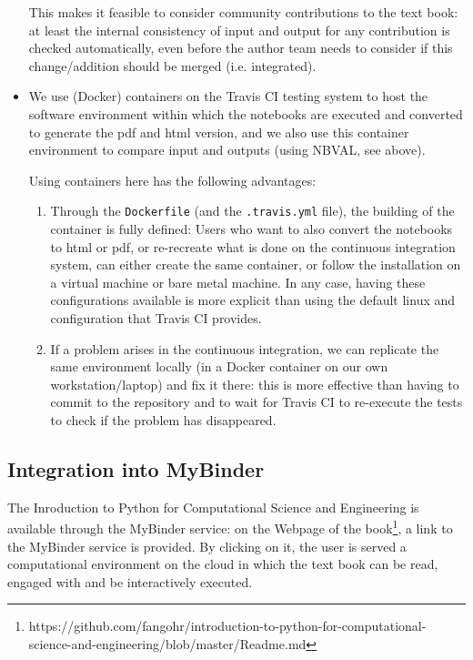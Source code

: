 \documentclass{deliverablereport}
\begin{document}
\begin{itemize}
  This makes it feasible to consider community contributions to the
  text book: at least the internal consistency of input and output for
  any contribution is checked automatically, even before the author
  team needs to consider if this change/addition should be merged
  (i.e. integrated).

\item We use (Docker) containers on the Travis CI testing system to
  host the software environment within which the notebooks are
  executed and converted to generate the pdf and html version, and we
  also use this container environment to compare input and outputs
  (using NBVAL, see above).

  Using containers here has the following advantages:
  \begin{enumerate}
  \item Through the \texttt{Dockerfile} (and the \texttt{.travis.yml}
    file), the building of the container is fully defined: Users who
    want to also convert the notebooks to html or pdf, or re-recreate
    what is done on the continuous integration system, can either
    create the same container, or follow the installation on a virtual
    machine or bare metal machine. In any case, having these
    configurations available is more explicit than using the default
    linux and configuration that Travis CI provides.

  \item If a problem arises in the continuous integration, we can
    replicate the same environment locally (in a Docker container on
    our own workstation/laptop) and fix it there: this is more
    effective than having to commit to the repository and to wait for
    Travis CI to re-execute the tests to check if the problem has
    disappeared.

  \end{enumerate}

\end{itemize}

\subsection{Integration into MyBinder}
The Inroduction to Python for Computational Science and Engineering is
available through the MyBinder service: on the Webpage of the
book\footnote{https://github.com/fangohr/introduction-to-python-for-computational-science-and-engineering/blob/master/Readme.md},
a link to the MyBinder service is provided. By clicking on it, the
user is served a computational environment on the cloud in which the
text book can be read, engaged with and be interactively executed.
\end{document}
